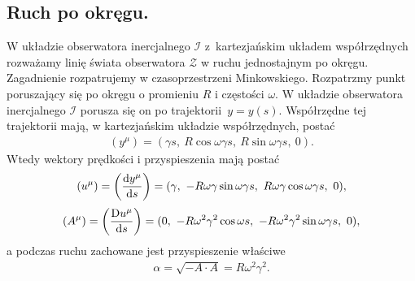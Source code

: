 \subsection{Ruch po okręgu.}
W układzie obserwatora inercjalnego $\mathcal{I}$ z~kartezjańskim 
układem współrzędnych rozważamy linię świata 
obserwatora $\mathcal{Z}$ w ruchu jednostajnym po okręgu.
Zagadnienie rozpatrujemy w czasoprzestrzeni Minkowskiego.
Rozpatrzmy punkt poruszający się po okręgu o promieniu $R$ i 
częstości $\omega$. W układzie
obserwatora inercjalnego $\mathcal{I}$ porusza się on po 
trajektorii~$y=y(s)$. Współrzędne tej trajektorii mają, w kartezjańskim 
układzie współrzędnych, postać
\begin{align*}
(y^\mu) = (\gamma s,\ R\cos\omega\gamma s,\ R\sin\omega\gamma s,\ 0).
\end{align*}
Wtedy wektory prędkości i przyspieszenia mają postać
\begin{align*}
(u^\mu) = \left( \frac{\text{d} y^\mu}{\text{d} s} \right) 
= (\gamma,\ -R\omega\gamma\sin\omega\gamma s,
\ R\omega\gamma\cos\omega\gamma s,\ 0),
\end{align*}
\begin{align*}
(A^\mu) = \left( \frac{\text{D} u^\mu}{\text{d} s}\right) 
= (0,\ -R\omega^2\gamma^2\cos\omega s
,\ -R\omega^2\gamma^2\sin\omega\gamma s,\ 0),
\end{align*}
a podczas ruchu zachowane jest przyspieszenie właściwe 
\begin{align*}
\alpha =\sqrt{ - A\cdot A} =  R\omega^2\gamma^2 .
\end{align*}

